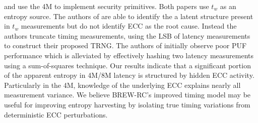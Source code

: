 \cite{tolga2024trng} and \cite{suri2018high} use the 4M to implement security primitives. Both papers use $t_w$ as an entropy source. The authors of \cite{tolga2024trng} are able to identify the a latent structure present in $t_w$ measurements but do not identify ECC as the root cause. Instead the authors truncate timing measurements, using the LSB of latency measurements to construct their proposed TRNG. The authors of \cite{suri2018high} initially observe poor PUF performance which is alleviated by effectively hashing two latency measurements using a sum-of-squares technique. Our results indicate that a significant portion of the apparent entropy in 4M/8M latency is structured by hidden ECC activity. Particularly in the 4M, knowledge of the underlying ECC explains nearly all measurement variance. We believe BREW-RC's improved timing model may be useful for improving entropy harvesting by isolating true timing variations from deterministic ECC perturbations.

